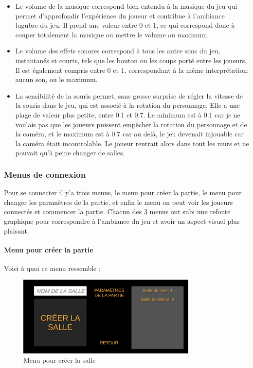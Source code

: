 \documentclass{article}
\begin{document}
\begin{itemize}
	\item{Le volume de la musique} correspond bien entendu à la musique du jeu qui permet d'approfondir l'expérience du joueur et contribue à l'ambiance lugubre du jeu. Il prend une valeur entre 0 et 1, ce qui correspond donc à couper totalement la musique ou mettre le volume au maximum.
	\item{Le volume des effets sonores} correspond à tous les autre sons du jeu, instantanés et courts, tels que les bouton ou les coups porté entre les joueurs. Il est également compris entre 0 et 1, correspondant à la même interprétation: aucun son, ou le maximum.
	\item{La sensibilité de la souris} permet, sans grosse surprise de régler la vitesse de la souris dans le jeu, qui est associé à la rotation du personnage. Elle a une plage de valeur plus petite, entre 0.1 et 0.7. Le minimum est à 0.1 car je ne voulais pas que les joueurs puissent empêcher la rotation du personnage et de la caméra, et le maximum est à 0.7 car au delà, le jeu devenait injouable car la caméra était incontrolable. Le joueur rentrait alors dans tout les murs et ne pouvait qu'à peine changer de salles.
\end{itemize}

\newpage
\subsubsection{Menus de connexion}
Pour se connecter il y'a trois menus, le menu pour créer la partie, le menu pour changer les paramètres de la partie, et enfin le menu on peut voir les joueurs connectés et commencer la partie. Chacun des 3 menus ont subi une refonte graphique pour correspondre à l'ambiance du jeu et avoir un aspect visuel plus plaisant.

\paragraph{Menu pour créer la partie}

Voici à quoi ce menu ressemble : 

\begin{figure}[!ht]
    \centering
    \includegraphics[width=0.8\textwidth]{Menu1.png}
    \caption{Menu pour créer la salle}
    \label{Menu pour créer la salle}
\end{figure}
\end{document}

